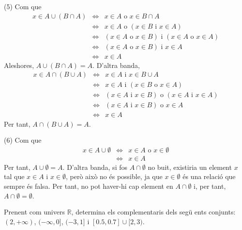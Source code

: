 \begin{solucio}
(5) Com que
\begin{equation*}
\begin{array}{lll}
x\in A\cup (B\cap A) & \Longleftrightarrow & x\in A\text{ o }x\in B\cap A \\
& \Longleftrightarrow & x\in A\text{ o }\left( x\in B\text{ i }x\in A\right)
\\
& \Longleftrightarrow & \left( x\in A\text{ o }x\in B\right) \text{ i }%
\left( x\in A\text{ o }x\in A\right) \\
& \Longleftrightarrow & \left( x\in A\text{ o }x\in B\right) \text{ i }x\in A
\\
& \Longleftrightarrow & x\in A%
\end{array}%
\end{equation*}%
Aleshores, $A\cup (B\cap A)=A$. D'altra banda,%
\begin{equation*}
\begin{array}{lll}
x\in A\cap (B\cup A) & \Longleftrightarrow & x\in A\text{ i }x\in B\cup A \\
& \Longleftrightarrow & x\in A\text{ i }\left( x\in B\text{ o }x\in A\right)
\\
& \Longleftrightarrow & \left( x\in A\text{ i }x\in B\right) \text{ o }%
\left( x\in A\text{ i }x\in A\right) \\
& \Longleftrightarrow & \left( x\in A\text{ i }x\in B\right) \text{ o }x\in A
\\
& \Longleftrightarrow & x\in A%
\end{array}%
\end{equation*}%
Per tant, $A\cap (B\cup A)=A$.

(6) Com que%
\begin{equation*}
\begin{array}{lll}
x\in A\cup \emptyset & \Longleftrightarrow & x\in A\text{ o }x\in \emptyset
\\
& \Longleftrightarrow & x\in A%
\end{array}%
\end{equation*}%
Per tant, $A\cup \emptyset =A$. D'altra banda, si fos $A\cap \emptyset $ no
buit, existiria un element $x$ tal que $x\in A$ i $x\in \emptyset $, per\`{o}
aix\`{o} no \'{e}s possible, ja que $x\in \emptyset $ \'{e}s una relaci\'{o}
que sempre \'{e}s falsa. Per tant, no pot haver-hi cap element en $A\cap
\emptyset $ i, per tant, $A\cap \emptyset =\emptyset $.
\end{solucio}

\begin{exer}
Prenent com univers $\mathbb{R}$, determina els complementaris dels seg\"{u}%
ents conjunts: $(2,+\infty )$, $(-\infty ,0]$, $(-3,1]$ i $[0.5,0.7]\cup
\lbrack 2,3)$.
\end{exer}

